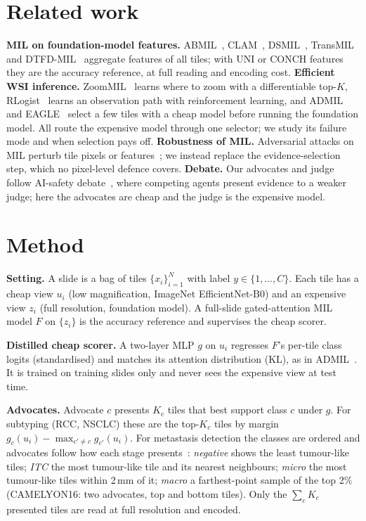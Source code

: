 \documentclass[10pt,twocolumn]{article}
\begin{document}
\section{Related work}
\textbf{MIL on foundation-model features.} ABMIL~\cite{ilse2018abmil}, CLAM~\cite{lu2021data}, DSMIL~\cite{li2021dual}, TransMIL~\cite{shao2021transmil} and DTFD-MIL~\cite{zhang2022dtfd} aggregate features of all tiles; with UNI or CONCH features they are the accuracy reference, at full reading and encoding cost.
\textbf{Efficient WSI inference.} ZoomMIL~\cite{thandiackal2022zoommil} learns where to zoom with a differentiable top-$K$, RLogist~\cite{zhao2023rlogist} learns an observation path with reinforcement learning, and ADMIL~\cite{admil2026} and EAGLE~\cite{eagle2026} select a few tiles with a cheap model before running the foundation model. All route the expensive model through one selector; we study its failure mode and when selection pays off.
\textbf{Robustness of MIL.} Adversarial attacks on MIL perturb tile pixels or features~\cite{foote2021now,mil_adv2022}; we instead replace the evidence-selection step, which no pixel-level defence covers.
\textbf{Debate.} Our advocates and judge follow AI-safety debate~\cite{irving2018debate,khan2024debate,kenton2024scalable}, where competing agents present evidence to a weaker judge; here the advocates are cheap and the judge is the expensive model.

\section{Method}
\textbf{Setting.} A slide is a bag of tiles $\{x_i\}_{i=1}^N$ with label $y\in\{1,\dots,C\}$. Each tile has a cheap view $u_i$ (low magnification, ImageNet EfficientNet-B0) and an expensive view $z_i$ (full resolution, foundation model). A full-slide gated-attention MIL model $F$ on $\{z_i\}$ is the accuracy reference and supervises the cheap scorer.

\textbf{Distilled cheap scorer.} A two-layer MLP $g$ on $u_i$ regresses $F$'s per-tile class logits (standardised) and matches its attention distribution (KL), as in ADMIL~\cite{admil2026}. It is trained on training slides only and never sees the expensive view at test time.

\textbf{Advocates.} Advocate $c$ presents $K_c$ tiles that best support class $c$ under $g$. For subtyping (RCC, NSCLC) these are the top-$K_c$ tiles by margin $g_c(u_i)-\max_{c'\neq c}g_{c'}(u_i)$. For metastasis detection the classes are ordered and advocates follow how each stage presents~\cite{camelyon17}: \emph{negative} shows the least tumour-like tiles; \emph{ITC} the most tumour-like tile and its nearest neighbours; \emph{micro} the most tumour-like tiles within 2\,mm of it; \emph{macro} a farthest-point sample of the top 2\% (CAMELYON16: two advocates, top and bottom tiles). Only the $\sum_c K_c$ presented tiles are read at full resolution and encoded.
\end{document}
